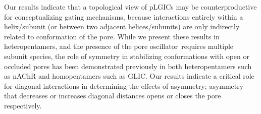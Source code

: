 \documentclass[journal=jacsat,manuscript=article]{achemso}
\newcommand{\fivering}{interfacial band~}
\newcommand{\triad}{pore oscillator~}
\begin{document}
Our results indicate that a topological view of pLGICs may be counterproductive for conceptualizing gating mechanisms, because interactions entirely within a helix/subunit (or between two adjacent helices/subunits) are only indirectly related to conformation of the pore.  %
While we present these results in heteropentamers, and the presence of the \triad requires multiple subunit species, the role of symmetry in stabilizing conformations with open or occluded pores has been demonstrated previously in both heteropentamers such as nAChR\cite{Mitra2005} and homopentamers such as GLIC. \cite{Mowrey2013} Our results indicate a critical role for diagonal interactions in determining the effects of asymmetry; asymmetry that decreases or increases diagonal distances opens or closes the pore respectively.  %

\end{document}
